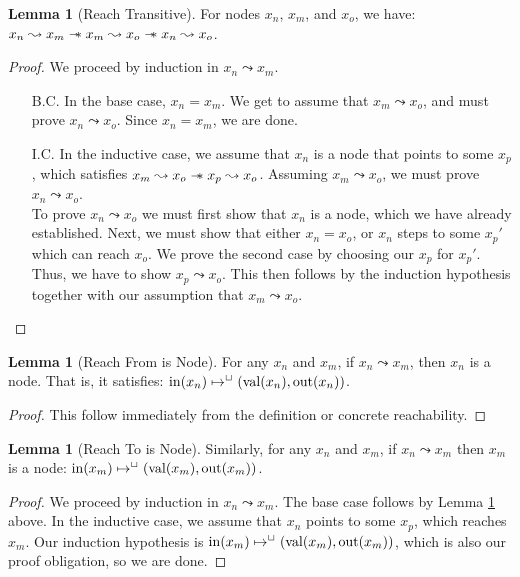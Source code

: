 \documentclass[a4paper, 10pt]{report}
\theoremstyle{definition}
\newtheorem{lemma}[theorem]{Lemma}
\newcommand{\nIn}[1]{\operatorname{in}(#1)}
\newcommand{\nVal}[1]{\operatorname{val}(#1)}
\newcommand{\nOut}[1]{\operatorname{out}(#1)}
\newcommand{\node}{x}
\newcommand{\nodeM}[1]{\node_{#1}}
\newcommand{\isNode}[1]{\nIn{#1} \mapsto^{\persistently} (\nVal{#1}, \nOut{#1})}
\newcommand{\reach}[2]{#1 \leadsto #2}
\begin{document}
\begin{lemma}[Reach Transitive]\label{lemma:reach-transitive}
  For nodes $\nodeM{n}$, $\nodeM{m}$, and $\nodeM{o}$, we have: $\reach{\nodeM{n}}{\nodeM{m}} \wand \reach{\nodeM{m}}{\nodeM{o}} \wand \reach{\nodeM{n}}{\nodeM{o}}$.
\end{lemma}
\begin{proof}
  We proceed by induction in $\reach{\nodeM{n}}{\nodeM{m}}$.
  \begin{itemize}
    \item[B.C.] In the base case, $\nodeM{n} = \nodeM{m}$. We get to assume that $\reach{\nodeM{m}}{\nodeM{o}}$, and must prove $\reach{\nodeM{n}}{\nodeM{o}}$. Since $\nodeM{n} = \nodeM{m}$, we are done.
    \item[I.C.] In the inductive case, we assume that $\nodeM{n}$ is a node that points to some $\nodeM{p}$, which satisfies $\reach{\nodeM{m}}{\nodeM{o}} \wand \reach{\nodeM{p}}{\nodeM{o}}$. Assuming $\reach{\nodeM{m}}{\nodeM{o}}$, we must prove $\reach{\nodeM{n}}{\nodeM{o}}$.\\
    To prove $\reach{\nodeM{n}}{\nodeM{o}}$ we must first show that $\nodeM{n}$ is a node, which we have already established. Next, we must show that either $\nodeM{n} = \nodeM{o}$, or $\nodeM{n}$ steps to some $\nodeM{p}'$ which can reach $\nodeM{o}$. We prove the second case by choosing our $\nodeM{p}$ for $\nodeM{p}'$. Thus, we have to show $\reach{\nodeM{p}}{\nodeM{o}}$. This then follows by the induction hypothesis together with our assumption that $\reach{\nodeM{m}}{\nodeM{o}}$.
  \end{itemize}
\end{proof}

\begin{lemma}[Reach From is Node]\label{lemma:reach-from-is-node}
  For any $\nodeM{n}$ and $\nodeM{m}$, if $\reach{\nodeM{n}}{\nodeM{m}}$, then $\nodeM{n}$ is a node. That is, it satisfies: $\isNode{\nodeM{n}}$.
\end{lemma}
\begin{proof}
  This follow immediately from the definition or concrete reachability.
\end{proof}

\begin{lemma}[Reach To is Node]\label{lemma:reach-to-is-node}
  Similarly, for any $\nodeM{n}$ and $\nodeM{m}$, if $\reach{\nodeM{n}}{\nodeM{m}}$ then $\nodeM{m}$ is a node: $\isNode{\nodeM{m}}$.
\end{lemma}
\begin{proof}
  We proceed by induction in $\reach{\nodeM{n}}{\nodeM{m}}$. The base case follows by Lemma \ref{lemma:reach-from-is-node} above. In the inductive case, we assume that $\nodeM{n}$ points to some $\nodeM{p}$, which reaches $\nodeM{m}$. Our induction hypothesis is $\isNode{\nodeM{m}}$, which is also our proof obligation, so we are done.
\end{proof}
\end{document}
